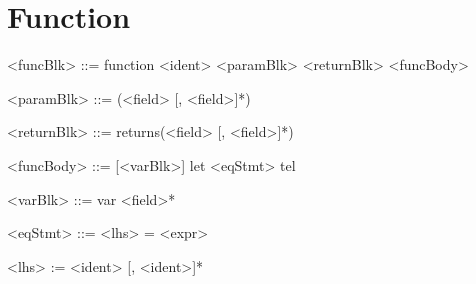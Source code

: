 \documentclass{article}
\begin{document}
\section{Function}
\begin{grammar}

<funcBlk> ::= function <ident> <paramBlk> <returnBlk> <funcBody>

<paramBlk> ::= (<field> [, <field>]*)

<returnBlk> ::= returns(<field> [, <field>]*)

<funcBody> ::= [<varBlk>] let <eqStmt> tel

<varBlk> ::= var <field>*

<eqStmt> ::= <lhs> = <expr>

<lhs> := <ident> [, <ident>]*

\end{grammar}
\end{document}
